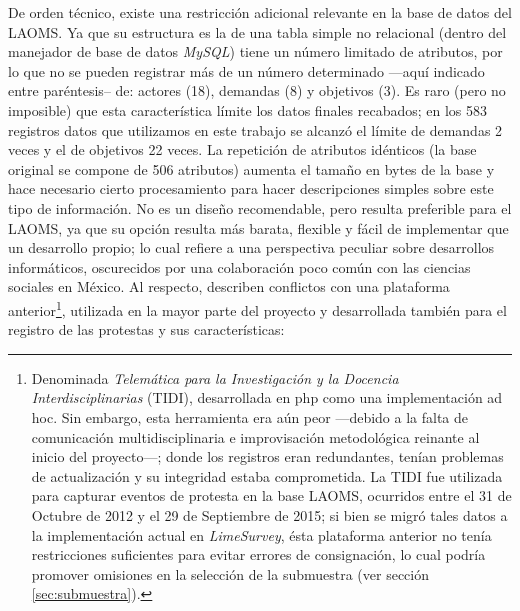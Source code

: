 \documentclass[letterpaper, 11pt]{book}
\theoremstyle{definition}
\theoremstyle{remark}
\begin{document}
De orden técnico, existe una restricción adicional relevante en la base de datos del LAOMS. 
Ya que su estructura es la de una tabla simple no relacional (dentro del manejador de base de datos \emph{MySQL}) tiene un número limitado de atributos, por lo que no se pueden registrar más de un número determinado ---aquí indicado entre paréntesis-- de: actores (18), demandas (8) y objetivos (3). 
Es raro (pero no imposible) que esta característica límite los datos finales recabados; en los 583 registros datos que utilizamos en este trabajo se alcanzó el límite de demandas 2 veces y el de objetivos 22 veces. La repetición de atributos idénticos (la base original se compone de 506  atributos) aumenta el tamaño en bytes de la base y hace necesario cierto procesamiento para hacer descripciones simples sobre este tipo de información. 
No es un diseño recomendable, pero resulta preferible para el LAOMS, ya que su opción resulta más barata, flexible y fácil de implementar que un desarrollo propio; lo cual refiere a una perspectiva peculiar sobre desarrollos informáticos, oscurecidos por una colaboración poco común con las ciencias sociales en México. 
Al respecto, describen conflictos con una plataforma anterior\footnote{
    Denominada \emph{Telemática para la Investigación y la Docencia Interdisciplinarias} (TIDI), desarrollada en php como una implementación ad hoc. 
    Sin embargo, esta herramienta era aún peor ---debido a la falta de comunicación multidisciplinaria e improvisación metodológica reinante al inicio del proyecto---; donde los registros eran redundantes, tenían problemas de actualización y su integridad estaba comprometida. 
    La TIDI fue utilizada para capturar eventos de protesta en la base LAOMS, ocurridos entre el 31 de Octubre de 2012 y el 29 de Septiembre de 2015; si bien se migró tales datos a la implementación actual en \emph{LimeSurvey}, ésta plataforma anterior no tenía restricciones suficientes para evitar errores de consignación, lo cual podría promover omisiones en la selección de la submuestra (ver sección \ref{sec:submuestra}). 
}, 
utilizada en la mayor parte del proyecto y desarrollada también para el registro de las protestas y sus características: 
\end{document}
